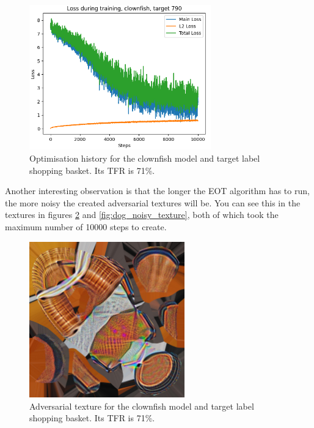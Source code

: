 \begin{figure}[ht]
    \centering
    \includegraphics[width=0.7\textwidth]{graphics/eot_clownfish_loss_history.PNG}
    \caption[Optimisation history for the clownfish model and target label shopping basket.]{Optimisation history for the clownfish model and target label shopping basket. Its TFR is 71\%.}
    \label{fig:eot_clownfish_loss_history}
\end{figure}

Another interesting observation is that the longer the EOT algorithm has to run, the more noisy the created adversarial textures will be. You can see this in the textures in figures  \ref{fig:clownfish_noisy_texture} and \ref{fig:dog_noisy_texture}, both of which took the maximum number of 10000 steps to create.

\begin{figure}[H]
    \centering
    \includegraphics[width=0.6\textwidth]{graphics/clownfish_790_adv_9999.jpg}
    \caption[Adversarial texture for the clownfish model and target label shopping basket.]{Adversarial texture for the clownfish model and target label shopping basket. Its TFR is 71\%.}
    \label{fig:clownfish_noisy_texture}
\end{figure}

